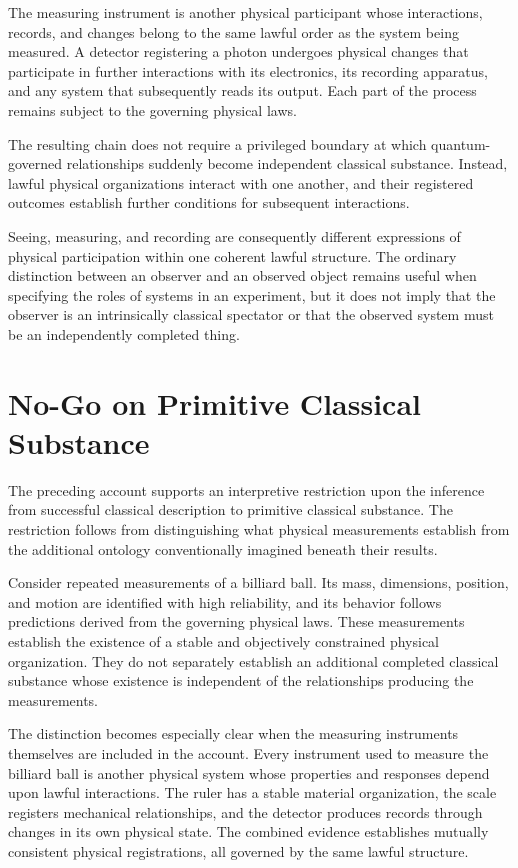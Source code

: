 \documentclass[12pt,onecolumn]{article}
\begin{document}
The measuring instrument is another physical participant whose interactions, records, and changes belong to the same lawful order as the system being measured. A detector registering a photon undergoes physical changes that participate in further interactions with its electronics, its recording apparatus, and any system that subsequently reads its output. Each part of the process remains subject to the governing physical laws.

The resulting chain does not require a privileged boundary at which quantum-governed relationships suddenly become independent classical substance. Instead, lawful physical organizations interact with one another, and their registered outcomes establish further conditions for subsequent interactions.

Seeing, measuring, and recording are consequently different expressions of physical participation within one coherent lawful structure. The ordinary distinction between an observer and an observed object remains useful when specifying the roles of systems in an experiment, but it does not imply that the observer is an intrinsically classical spectator or that the observed system must be an independently completed thing.

\section{No-Go on Primitive Classical Substance}

The preceding account supports an interpretive restriction upon the inference from successful classical description to primitive classical substance. The restriction follows from distinguishing what physical measurements establish from the additional ontology conventionally imagined beneath their results.

Consider repeated measurements of a billiard ball. Its mass, dimensions, position, and motion are identified with high reliability, and its behavior follows predictions derived from the governing physical laws. These measurements establish the existence of a stable and objectively constrained physical organization. They do not separately establish an additional completed classical substance whose existence is independent of the relationships producing the measurements.

The distinction becomes especially clear when the measuring instruments themselves are included in the account. Every instrument used to measure the billiard ball is another physical system whose properties and responses depend upon lawful interactions. The ruler has a stable material organization, the scale registers mechanical relationships, and the detector produces records through changes in its own physical state. The combined evidence establishes mutually consistent physical registrations, all governed by the same lawful structure.
\end{document}
